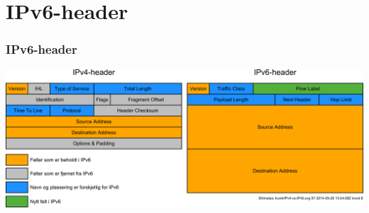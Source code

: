 \section{IPv6-header}
\begin{frame}%
  \frametitle{IPv6-header}
  \pause
  \begin{center}
      {\includegraphics[scale=.2274]{IPv4-vs-IPv6.pdf}}
  \end{center}
\end{frame}

